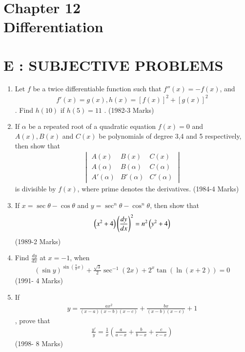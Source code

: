 \documentclass[journal,,12pt,twocolumn]{IEEEtran}
\theoremstyle{remark}
\begin{document}
    
    
    
    \section*{Chapter 12 \\ Differentiation}



\section*{E : SUBJECTIVE PROBLEMS}
\begin{enumerate}
\item Let $f$ be a twice differentiable function such that 
$f''(x)=-f(x)$, and \begin{align*}f'(x)=g(x) , h(x)=[f(x)]^2+[g(x)]^2\end{align*}. Find $h(10)$ if $h(5)=11$ .
\hfill{(1982-3 Marks)}
\item If $\alpha$ be a repeated root of a quadratic equation $f(x)=0$ and $A(x),B(x)$ and $C(x)$ be polynomials of degree 3,4 and 5 respectively, then show that \begin{align*}\begin{vmatrix}
A(x) & B(x) & C(x) \\
A(\alpha) & B(\alpha) & C(\alpha) \\
A'(\alpha) & B'(\alpha) & C'(\alpha) 
\end{vmatrix} \end{align*}
is divisible by $f(x)$, where prime denotes the derivatives.
\hfill{(1984-4 Marks)}
\item If $x=\sec{\theta}-\cos{\theta}$ and $y=\sec^n{\theta}-\cos^n{\theta}$, then show that \begin{align*} \left(x^2 + 4\right) \left(\frac{dy}{dx}\right)^2=n^2 \left(y^2+4\right) \end{align*}
\hfill{(1989-2 Marks)}
\item Find $\frac{dy}{dx}$ at $x=-1$, when \begin{align*}(\sin{y})^{\sin(\frac{\pi}{2}x)} + \frac{\sqrt{3}}{2}\sec^{-1}{(2x)} + 2^x\tan{(\ln{(x+2)})} = 0 \end{align*}
\hfill{(1991- 4 Marks)}
\item If \begin{align*}y = \frac{ax^2}{(x-a)(x-b)(x-c)}+\frac{bx}{(x-b)(x-c)}+1\end{align*}, prove that \begin{align*}\frac{y'}{y}=\frac{1}{x}(\frac{a}{a-x}+\frac{b}{b-x}+\frac{c}{c-x})\end{align*}
\hfill{(1998- 8 Marks)}
\end{enumerate}
\end{document}
